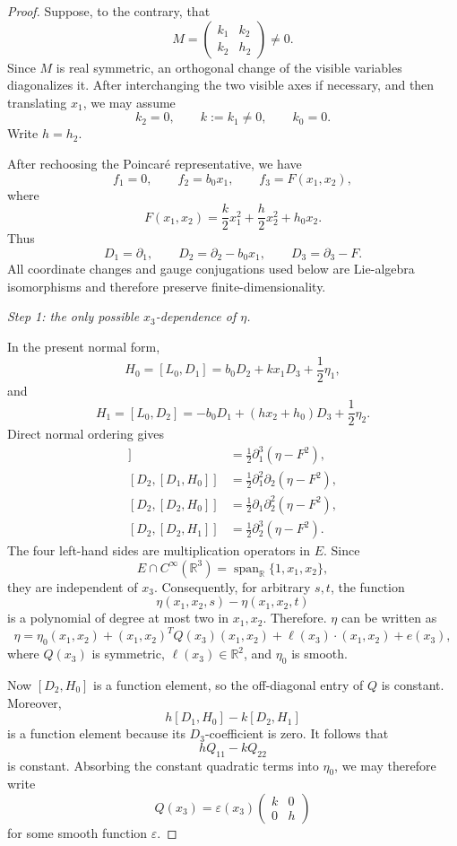 \documentclass[11pt,a4paper]{article}
\numberwithin{equation}{section}
\theoremstyle{journalplain}
\theoremstyle{journaldef}
\begin{document}
\begin{proof}
Suppose, to the contrary, that
\[
M=
\begin{pmatrix}
k_1&k_2\\
k_2&h_2
\end{pmatrix}
\ne0.
\]
Since \(M\) is real symmetric, an orthogonal change of the visible
variables diagonalizes it. After interchanging the two visible axes if
necessary, and then translating \(x_1\), we may assume
\[
k_2=0,\qquad k:=k_1\ne0,\qquad k_0=0.
\]
Write \(h=h_2\). 

After rechoosing the Poincar\'e representative, we have
\[
f_1=0,\qquad f_2=b_0x_1,\qquad
f_3=F(x_1,x_2),
\]
where
\[
F(x_1,x_2)
=\frac{k}{2}x_1^2+\frac{h}{2}x_2^2+h_0x_2.
\]
Thus
\[
D_1=\partial_1,\qquad
D_2=\partial_2-b_0x_1,\qquad
D_3=\partial_3-F.
\]
All coordinate changes and gauge conjugations used below are Lie-algebra
isomorphisms and therefore preserve finite-dimensionality.

\medskip
\noindent\emph{Step 1: the only possible \(x_3\)-dependence of \(\eta\).}

In the present normal form,
\[
H_0=[L_0,D_1]
=b_0D_2+kx_1D_3+\frac12\eta_1,
\]
and
\[
H_1=[L_0,D_2]
=-b_0D_1+(hx_2+h_0)D_3+\frac12\eta_2.
\]
Direct normal ordering gives
\begin{align*}
[D_1,[D_1,H_0]]
 &=\frac12\partial_1^3(\eta-F^2),\\
[D_2,[D_1,H_0]]
 &=\frac12\partial_1^2\partial_2(\eta-F^2),\\
[D_2,[D_2,H_0]]
 &=\frac12\partial_1\partial_2^2(\eta-F^2),\\
[D_2,[D_2,H_1]]
 &=\frac12\partial_2^3(\eta-F^2).
\end{align*}
The four left-hand sides are multiplication operators in \(E\). Since
\[
E\cap C^\infty(\mathbb R^3)
=\operatorname{span}_{\mathbb R}\{1,x_1,x_2\},
\]
they are independent of \(x_3\). Consequently, for arbitrary \(s,t\),
the function
\[
\eta(x_1,x_2,s)-\eta(x_1,x_2,t)
\]
is a polynomial of degree at most two in \(x_1,x_2\). Therefore. $\eta$ can be written as
\[
\eta
=\eta_0(x_1,x_2)
+(x_1,x_2)^TQ(x_3)(x_1,x_2)+\ell(x_3)\cdot (x_1,x_2)+e(x_3),
\]
where \(Q(x_3)\) is symmetric, \(\ell(x_3)\in\mathbb R^2\), and
\(\eta_0\) is smooth.

Now \([D_2,H_0]\) is a function element, so the off-diagonal entry of
\(Q\) is constant. Moreover,
\[
h[D_1,H_0]-k[D_2,H_1]
\]
is a function element because its \(D_3\)-coefficient is zero. It follows
that
\[
hQ_{11}-kQ_{22}
\]
is constant. Absorbing the constant quadratic terms into \(\eta_0\), we
may therefore write
\[
Q(x_3)
=\varepsilon(x_3)
\begin{pmatrix}
k&0\\
0&h
\end{pmatrix}
\]
for some smooth function \(\varepsilon\).


\end{proof}
\end{document}
